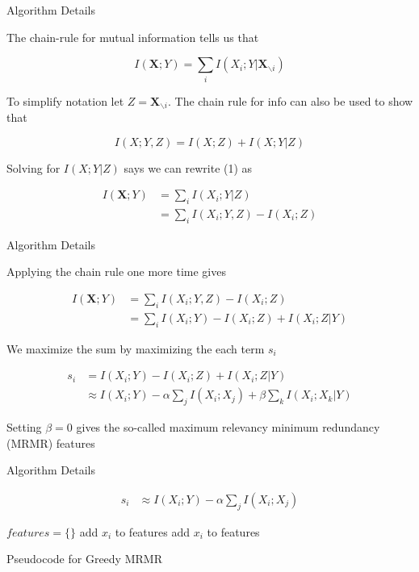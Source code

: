 \documentclass{beamer}					%
\begin{document}
\begin{frame}{Algorithm Details}

The chain-rule for mutual information tells us that

\begin{equation}
I(\bm{X};Y) = \sum_{i}I(X_{i};Y|\bm{X}_{\backslash i})
\end{equation} 

To simplify notation let $Z = \bm{X}_{\backslash i}$. The chain rule for info can also be used to show that 

\begin{equation*}
I(X;Y,Z) = I(X;Z) + I(X;Y|Z)
\end{equation*}

Solving for $I(X;Y|Z)$ says we can rewrite (1) as

\begin{align*}
I(\bm{X};Y) &= \sum_{i}I(X_{i};Y|Z)\\
&= \sum_{i}I(X_{i};Y,Z) - I(X_{i};Z)
\end{align*} 

\end{frame}

\begin{frame}{Algorithm Details}

Applying the chain rule one more time gives

\begin{align*}
I(\bm{X};Y) &= \sum_{i}I(X_{i};Y,Z) - I(X_{i};Z)\\
&= \sum_{i}I(X_{i};Y)- I(X_{i};Z) + I(X_{i};Z|Y)
\end{align*} 


We maximize the sum by maximizing the each term $s_{i}$

\begin{align*}
s_{i} &= I(X_{i};Y)- I(X_{i};Z) + I(X_{i};Z|Y)\\
&\approx I(X_{i};Y)- \alpha\sum_{j}I(X_{i};X_{j}) + \beta\sum_{k}I(X_{i};X_{k}|Y)
\end{align*}

Setting $\beta=0$ gives the so-called maximum relevancy minimum redundancy (MRMR) features

\end{frame}

\begin{frame}{Algorithm Details}

\begin{align*}
s_{i} &\approx I(X_{i};Y)- \alpha\sum_{j}I(X_{i};X_{j}) 
\end{align*}

\begin{algorithm}[H]
\begin{algorithmic}[1]
\STATE $features = \{\}$
    \STATE add $x_{i}$ to features
  \ELSE
    \STATE add $x_{i}$ to features
  \ENDIF
  \ENDIF
\ENDFOR
\end{algorithmic}
\caption{Pseudocode for Greedy MRMR}
\label{alg:seq}
\end{algorithm}

\end{frame}
\end{document}
